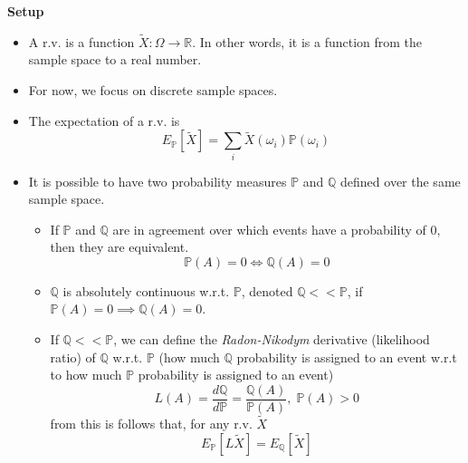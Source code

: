 \documentclass[11pt]{article}
\begin{document}
\textbf{Setup}
\begin{itemize}
    \item A r.v. is a function $\tilde{X}: \Omega \rightarrow \mathbb{R}$. In other words, it 
    is a function from the sample space to a real number. 
    \item For now, we focus on discrete sample spaces.
    \item The expectation of a r.v. is 
    \[E_{\mathbb{P}}[\tilde{X}] = \sum_{i} \tilde{X}(\omega_i)\mathbb{P}(\omega_i)\]
    \item It is possible to have two probability measures $\mathbb{P}$ and $\mathbb{Q}$ defined 
    over the same sample space. 
    \begin{itemize}
        \item If $\mathbb{P}$ and $\mathbb{Q}$ are in agreement over which events have a 
        probability of 0, then they are equivalent. 
        \[\mathbb{P}(A) = 0 \iff \mathbb{Q}(A) = 0\]
        \item $\mathbb{Q}$ is absolutely continuous w.r.t. $\mathbb{P}$, denoted $\mathbb{Q} << 
        \mathbb{P}$, if $\mathbb{P}(A) = 0 \implies \mathbb{Q}(A) = 0$.
        \item If $\mathbb{Q} << \mathbb{P}$, we can define the \textit{Radon-Nikodym} 
        derivative (likelihood ratio) of $\mathbb{Q}$ w.r.t. $\mathbb{P}$ (how much 
        $\mathbb{Q}$ probability is assigned to an event w.r.t to how much $\mathbb{P}$ 
        probability is assigned to an event)
        \[L(A) = \frac{d\mathbb{Q}}{d\mathbb{P}} = \frac{\mathbb{Q}(A)}{\mathbb{P}(A)}, \; 
        \mathbb{P}(A) > 0\]
        from this is follows that, for any r.v. $\tilde{X}$
        \[E_{\mathbb{P}}[L\tilde{X}] = E_{\mathbb{Q}}[\tilde{X}]\]
    \end{itemize}
\end{itemize}
\end{document}
